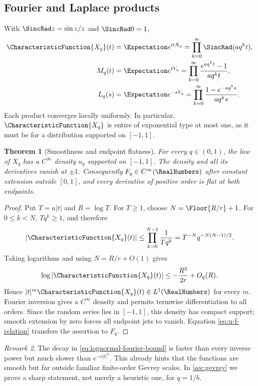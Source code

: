 \documentclass[11pt,oneside]{article}
\newtheorem{theorem}{Theorem}[section]
\theoremstyle{definition}
\theoremstyle{remark}
\newtheorem{remark}[theorem]{Remark}
\begin{document}
\subsection{Fourier and Laplace products}

With $\SincRad z=\sin z/z$ and $\SincRad0=1$,
\begin{align}
 \CharacteristicFunction{X_q}(t)&=\Expectation e^{itX_q}
   =\prod_{k=0}^{\infty}\SincRad(aq^kt),
 \label{eq:qfourier}\\
 M_q(t)&=\Expectation e^{tV_q}
   =\prod_{k=0}^{\infty}\frac{e^{aq^kt}-1}{aq^kt},
 \label{eq:qmgf}\\
 L_q(s)&=\Expectation e^{-sV_q}
   =\prod_{k=0}^{\infty}\frac{1-e^{-aq^ks}}{aq^ks}.
 \label{eq:qlaplace}
\end{align}
Each product converges locally uniformly.  In particular, $\CharacteristicFunction{X_q}$ is entire of
exponential type at most one, as it must be for a distribution supported on
$[-1,1]$.

\begin{theorem}[Smoothness and endpoint flatness]
\label{thm:smoothness}
For every $q\in(0,1)$, the law of $X_q$ has a $C^\infty$ density $u_q$ supported on
$[-1,1]$.  The density and all its derivatives vanish at $\pm1$.  Consequently
$F_q\in C^\infty(\RealNumbers)$ after constant extension outside $[0,1]$, and every derivative
of positive order is flat at both endpoints.
\end{theorem}

\begin{proof}
Put $T=a|t|$ and $R=\log T$.  For $T\ge1$, choose
$N=\Floor{R/r}+1$.  For $0\le k<N$, $Tq^k\ge1$, and therefore
\[
 |\CharacteristicFunction{X_q}(t)|
 \le\prod_{k=0}^{N-1}\frac1{Tq^k}
 =T^{-N}q^{-N(N-1)/2}.
\]
Taking logarithms and using $N=R/r+O(1)$ gives
\begin{equation}
 \log|\CharacteristicFunction{X_q}(t)|\le-\frac{R^2}{2r}+O_q(R).
 \label{eq:lognormal-fourier-bound}
\end{equation}
Hence $|t|^m\CharacteristicFunction{X_q}(t)\in L^1(\RealNumbers)$ for every $m$.  Fourier inversion gives a
$C^\infty$ density and permits termwise differentiation to all orders.  Since the
random series lies in $[-1,1]$, this density has compact support; smooth extension by
zero forces all endpoint jets to vanish.  Equation \eqref{eq:u-f-relation} transfers
the assertion to $F_q$.
\end{proof}

\begin{remark}
The decay in \eqref{eq:lognormal-fourier-bound} is faster than every inverse power but
much slower than $e^{-c|t|^\alpha}$.  This already hints that the functions are smooth
but far outside familiar finite-order Gevrey scales.  In \cref{sec:gevrey} we prove a
sharp statement, not merely a heuristic one, for $q=1/b$.
\end{remark}
\end{document}
